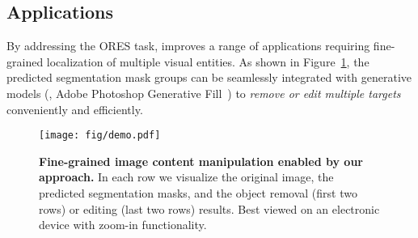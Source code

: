 \subsection{Applications}
\label{sec:expr-demo}
By addressing the ORES task, \ourmodel improves a range of applications requiring fine-grained localization of multiple visual entities. As shown in Figure~\ref{fig:demo}, the predicted segmentation mask groups can be seamlessly integrated with generative models (\eg, Adobe Photoshop Generative Fill~\cite{adobephotoshop}) to \emph{remove or edit multiple targets} conveniently and efficiently.

\begin{figure}[ht]
    \centering
    \texttt{[image: fig/demo.pdf]}
    \caption{\textbf{Fine-grained image content manipulation enabled by our approach.} In each row we visualize the original image, the predicted segmentation masks, and the object removal (first two rows) or editing (last two rows) results. Best viewed on an electronic device with zoom-in functionality.}
    \label{fig:demo}
    \vspace{-4mm}
\end{figure}
